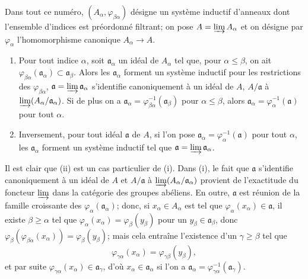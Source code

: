 Dans tout ce numéro, $(A_\alpha,\varphi_{\beta\alpha})$ désigne un système
inductif d'anneaux dont l'ensemble d'indices est préordonné filtrant; on pose
$A=\varinjlim A_\alpha$ et on désigne par $\varphi_\alpha$ l'homomorphisme
canonique $A_\alpha\to A$.

\begin{proposition}[5.13.1]
\label{IV.2.s5.13.1-fr}
\begin{enumerate}
\item[(i)] Pour tout indice $\alpha$, soit $\mathfrak a_\alpha$ un idéal de
$A_\alpha$ tel que, pour $\alpha\leq\beta$, on ait
$\varphi_{\beta\alpha}(\mathfrak a_\alpha)\subset\mathfrak a_\beta$. Alors
les $\mathfrak a_\alpha$ forment un système inductif pour les restrictions des
$\varphi_{\beta\alpha}$, $\mathfrak a=\varinjlim\mathfrak a_\alpha$
s'identifie canoniquement à un idéal de $A$, $A/\mathfrak a$ à
$\varinjlim(A_\alpha/\mathfrak a_\alpha)$. Si de plus on a
$\mathfrak a_\alpha=\varphi_{\beta\alpha}^{-1}(\mathfrak a_\beta)$ pour
$\alpha\leq\beta$, alors
$\mathfrak a_\alpha=\varphi_\alpha^{-1}(\mathfrak a)$ pour tout $\alpha$.
\item[(ii)] Inversement, pour tout idéal $\mathfrak a$ de $A$, si l'on pose
$\mathfrak a_\alpha=\varphi_\alpha^{-1}(\mathfrak a)$ pour tout $\alpha$, les
$\mathfrak a_\alpha$ forment un système inductif tel que
$\mathfrak a=\varinjlim\mathfrak a_\alpha$.
\end{enumerate}
\end{proposition}

Il est clair que (ii) est un cas particulier de (i). Dans (i), le fait que
$\mathfrak a$ s'identifie canoniquement à un idéal de $A$ et $A/\mathfrak a$ à
$\varinjlim(A_\alpha/\mathfrak a_\alpha)$ provient de l'exactitude du foncteur
$\varinjlim$ dans la catégorie des groupes abéliens. En outre, $\mathfrak a$
est réunion de la famille croissante des $\varphi_\alpha(\mathfrak a_\alpha)$;
donc, si $x_\alpha\in A_\alpha$ est tel que
$\varphi_\alpha(x_\alpha)\in\mathfrak a$, il existe $\beta\geq\alpha$ tel que
$\varphi_\alpha(x_\alpha)=\varphi_\beta(y_\beta)$ pour un
$y_\beta\in\mathfrak a_\beta$, donc
$\varphi_\beta(\varphi_{\beta\alpha}(x_\alpha))=\varphi_\beta(y_\beta)$; mais
cela entraîne l'existence d'un $\gamma\geq\beta$ tel que
\[
\varphi_{\gamma\alpha}(x_\alpha)=\varphi_{\gamma\beta}(y_\beta),
\]
et par suite $\varphi_{\gamma\alpha}(x_\alpha)\in\mathfrak a_\gamma$, d'où
$x_\alpha\in\mathfrak a_\alpha$ si l'on a
$\mathfrak a_\alpha=\varphi_{\gamma\alpha}^{-1}(\mathfrak a_\gamma)$.

